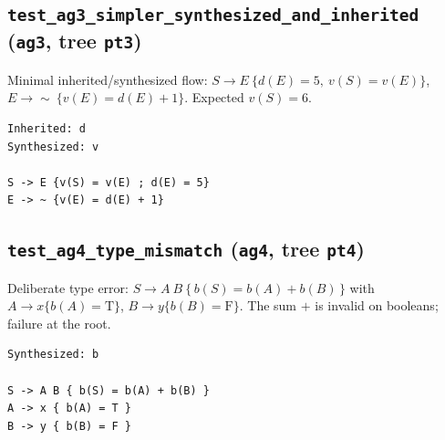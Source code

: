 \subsection{\texttt{test\_ag3\_simpler\_synthesized\_and\_inherited} (\texttt{ag3}, tree \texttt{pt3})}
 Minimal inherited/synthesized flow: \(S\to E\ \{d(E)=5,\ v(S)=v(E)\}\), \(E\to \sim\ \{v(E)=d(E)+1\}\). Expected \(v(S)=6\). 

\begin{verbatim}
Inherited: d
Synthesized: v

S -> E {v(S) = v(E) ; d(E) = 5}
E -> ~ {v(E) = d(E) + 1}
\end{verbatim}


\vspace{1cm}


\subsection{\texttt{test\_ag4\_type\_mismatch} (\texttt{ag4}, tree \texttt{pt4})}
Deliberate type error: \(S\to A\ B\ \{\,b(S)=b(A)+b(B)\,\}\) with \(A\to x\{b(A)=\mathrm{T}\}\), \(B\to y\{b(B)=\mathrm{F}\}\). The sum \(+\) is invalid on booleans; failure at the root. 

\begin{verbatim}
Synthesized: b

S -> A B { b(S) = b(A) + b(B) }
A -> x { b(A) = T }
B -> y { b(B) = F }
\end{verbatim}







